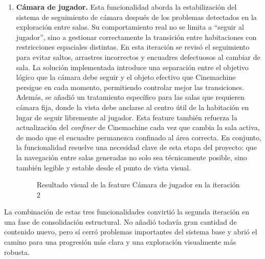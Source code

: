 \begin{enumerate}
\begin{figure}[H]
\begin{center}
\caption{Resultado visual de la feature Lógica de círculos en la iteración 2}
\label{fig:iteracion2-feature-circulos}
\end{center}
\end{figure}

\item \textbf{Cámara de jugador.} Esta funcionalidad aborda la estabilización del sistema de
seguimiento de cámara después de los problemas detectados en la exploración entre salas. Su
comportamiento real no se limita a ``seguir al jugador'', sino a gestionar correctamente la
transición entre habitaciones con restricciones espaciales distintas. En esta iteración se
revisó el seguimiento para evitar saltos, arrastres incorrectos y encuadres defectuosos al
cambiar de sala. La solución implementada introduce una separación entre el objetivo lógico
que la cámara debe seguir y el objeto efectivo que Cinemachine persigue en cada momento,
permitiendo controlar mejor las transiciones. Además, se añadió un tratamiento específico
para las salas que requieren cámara fija, donde la vista debe anclarse al centro útil de la
habitación en lugar de seguir libremente al jugador. Esta feature también refuerza la
actualización del \textit{confiner} de Cinemachine cada vez que cambia la sala activa, de
modo que el encuadre permanezca confinado al área correcta. En conjunto, la funcionalidad
resuelve una necesidad clave de esta etapa del proyecto: que la navegación entre salas
generadas no solo sea técnicamente posible, sino también legible y estable desde el punto
de vista visual.

\begin{figure}[H]
\begin{center}
\caption{Resultado visual de la feature Cámara de jugador en la iteración 2}
\label{fig:iteracion2-feature-camara}
\end{center}
\end{figure}
\end{enumerate}

La combinación de estas tres funcionalidades convirtió la segunda iteración en una fase de
consolidación estructural. No añadió todavía gran cantidad de contenido nuevo, pero sí
cerró problemas importantes del sistema base y abrió el camino para una progresión más
clara y una exploración visualmente más robusta.

